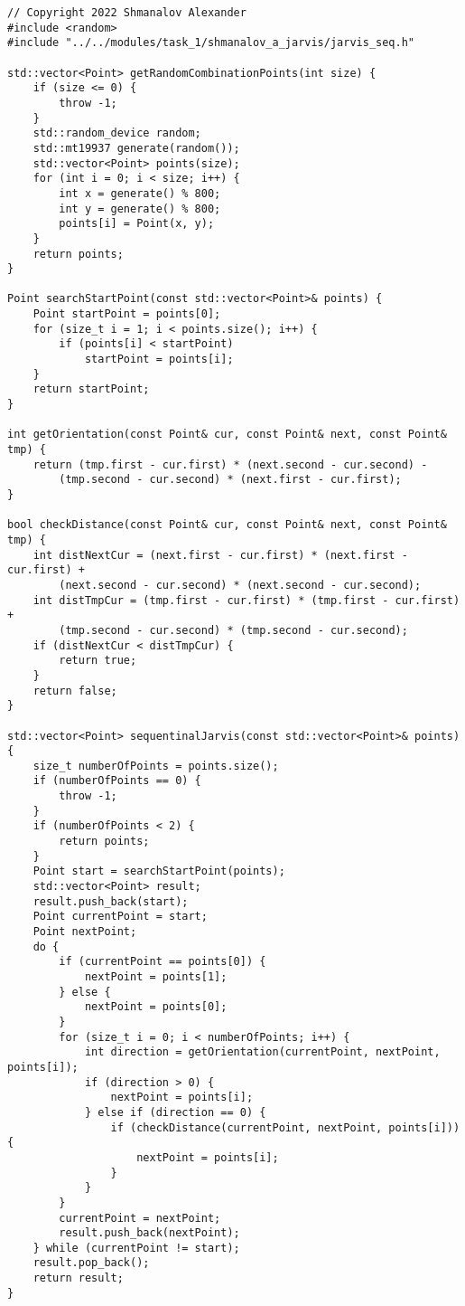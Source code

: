 \documentclass{report}
\begin{document}
\begin{lstlisting}
// Copyright 2022 Shmanalov Alexander
#include <random>
#include "../../modules/task_1/shmanalov_a_jarvis/jarvis_seq.h"

std::vector<Point> getRandomCombinationPoints(int size) {
    if (size <= 0) {
        throw -1;
    }
    std::random_device random;
    std::mt19937 generate(random());
    std::vector<Point> points(size);
    for (int i = 0; i < size; i++) {
        int x = generate() % 800;
        int y = generate() % 800;
        points[i] = Point(x, y);
    }
    return points;
}

Point searchStartPoint(const std::vector<Point>& points) {
    Point startPoint = points[0];
    for (size_t i = 1; i < points.size(); i++) {
        if (points[i] < startPoint)
            startPoint = points[i];
    }
    return startPoint;
}

int getOrientation(const Point& cur, const Point& next, const Point& tmp) {
    return (tmp.first - cur.first) * (next.second - cur.second) -
        (tmp.second - cur.second) * (next.first - cur.first);
}

bool checkDistance(const Point& cur, const Point& next, const Point& tmp) {
    int distNextCur = (next.first - cur.first) * (next.first - cur.first) +
        (next.second - cur.second) * (next.second - cur.second);
    int distTmpCur = (tmp.first - cur.first) * (tmp.first - cur.first) +
        (tmp.second - cur.second) * (tmp.second - cur.second);
    if (distNextCur < distTmpCur) {
        return true;
    }
    return false;
}

std::vector<Point> sequentinalJarvis(const std::vector<Point>& points) {
    size_t numberOfPoints = points.size();
    if (numberOfPoints == 0) {
        throw -1;
    }
    if (numberOfPoints < 2) {
        return points;
    }
    Point start = searchStartPoint(points);
    std::vector<Point> result;
    result.push_back(start);
    Point currentPoint = start;
    Point nextPoint;
    do {
        if (currentPoint == points[0]) {
            nextPoint = points[1];
        } else {
            nextPoint = points[0];
        }
        for (size_t i = 0; i < numberOfPoints; i++) {
            int direction = getOrientation(currentPoint, nextPoint, points[i]);
            if (direction > 0) {
                nextPoint = points[i];
            } else if (direction == 0) {
                if (checkDistance(currentPoint, nextPoint, points[i])) {
                    nextPoint = points[i];
                }
            }
        }
        currentPoint = nextPoint;
        result.push_back(nextPoint);
    } while (currentPoint != start);
    result.pop_back();
    return result;
}
\end{lstlisting}
\end{document}
